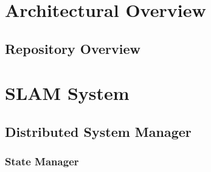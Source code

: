 






\label{sec:3}

\section{Architectural Overview}
\label{sec:architectural-overview}

\subsection{Repository Overview}
\label{sec:repository-overview}

\section{SLAM System}
\label{sec:slam-system}

\subsection{Distributed System Manager}
\label{sec:distributed-system-manager}

\subsubsection{State Manager}
\label{sec:state-manager}

